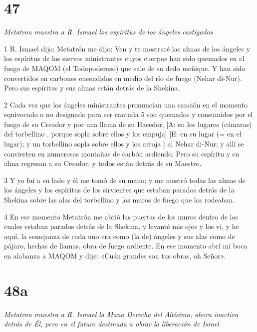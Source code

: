 \chapter{47}

\par \textit{Metatron muestra a R. Ismael los espíritus de los ángeles castigados}

\par 1 R. Ismael dijo: Metatrón me dijo: Ven y te mostraré las almas de los ángeles y los espíritus de los siervos ministrantes cuyos cuerpos han sido quemados en el fuego de MAQOM (el Todopoderoso) que sale de su dedo meñique. Y han sido convertidos en carbones encendidos en medio del río de fuego (Nehar di-Nur). Pero sus espíritus y sus almas están detrás de la Shekina.

\par 2 Cada vez que los ángeles ministrantes pronuncian una canción en el momento equivocado o no designado para ser cantada 5 son quemados y consumidos por el fuego de su Creador y por una llama de su Hacedor, [A: en los lugares (cámaras) del torbellino , porque sopla sobre ellos y los empuja] [E: en su lugar (= en el lugar); y un torbellino sopla sobre ellos y los arroja ] al Nehar di-Nur; y allí se convierten en numerosas montañas de carbón ardiendo. Pero su espíritu y su alma regresan a su Creador, y todos están detrás de su Maestro.

\par 3 Y yo fui a su lado y él me tomó de su mano; y me mostró todas las almas de los ángeles y los espíritus de los sirvientes que estaban parados detrás de la Shekina sobre las alas del torbellino y los muros de fuego que los rodeaban.

\par 4 En ese momento Metatrón me abrió las puertas de los muros dentro de los cuales estaban parados detrás de la Shekina, y levanté mis ojos y los vi, y he aquí, la semejanza de cada uno era como (la de) ángeles y sus alas como de pájaro, hechas de llamas, obra de fuego ardiente. En ese momento abrí mi boca en alabanza a MAQOM y dije: «Cuán grandes son tus obras, oh Señor».

\chapter{48a}

\par \textit{Metatron muestra a R. Ismael la Mano Derecha del Altísimo, ahora inactiva detrás de Él, pero en el futuro destinada a obrar la liberación de Israel}

